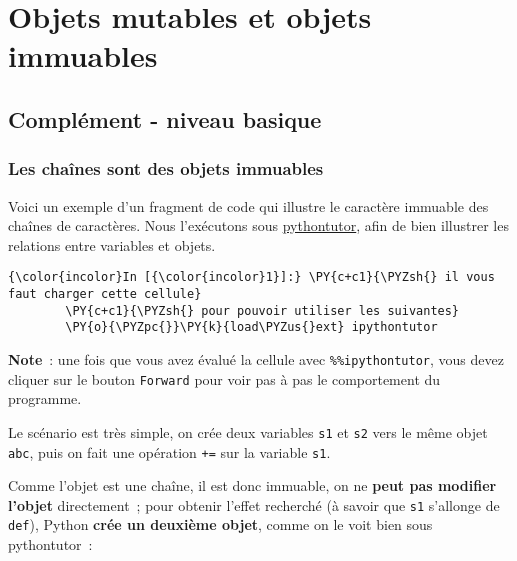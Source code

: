     
    
    
    

    

    \hypertarget{objets-mutables-et-objets-immuables}{%
\section{Objets mutables et objets
immuables}\label{objets-mutables-et-objets-immuables}}

    \hypertarget{compluxe9ment---niveau-basique}{%
\subsection{Complément - niveau
basique}\label{compluxe9ment---niveau-basique}}

    \hypertarget{les-chauxeenes-sont-des-objets-immuables}{%
\subsubsection{Les chaînes sont des objets
immuables}\label{les-chauxeenes-sont-des-objets-immuables}}

    Voici un exemple d'un fragment de code qui illustre le caractère
immuable des chaînes de caractères. Nous l'exécutons sous
\href{pythontutor.com}{pythontutor}, afin de bien illustrer les
relations entre variables et objets.

    \begin{Verbatim}[commandchars=\\\{\},frame=single,framerule=0.3mm,rulecolor=\color{cellframecolor}]
{\color{incolor}In [{\color{incolor}1}]:} \PY{c+c1}{\PYZsh{} il vous faut charger cette cellule}
        \PY{c+c1}{\PYZsh{} pour pouvoir utiliser les suivantes}
        \PY{o}{\PYZpc{}}\PY{k}{load\PYZus{}ext} ipythontutor
\end{Verbatim}


    \textbf{Note}~: une fois que vous avez évalué la cellule avec
\texttt{\%\%ipythontutor}, vous devez cliquer sur le bouton
\texttt{Forward} pour voir pas à pas le comportement du programme.

    Le scénario est très simple, on crée deux variables \texttt{s1} et
\texttt{s2} vers le même objet
\texttt{\textquotesingle{}abc\textquotesingle{}}, puis on fait une
opération \texttt{+=} sur la variable \texttt{s1}.

Comme l'objet est une chaîne, il est donc immuable, on ne \textbf{peut
pas modifier l'objet} directement~; pour obtenir l'effet recherché (à
savoir que \texttt{s1} s'allonge de
\texttt{\textquotesingle{}def\textquotesingle{}}), Python \textbf{crée
un deuxième objet}, comme on le voit bien sous pythontutor~:


